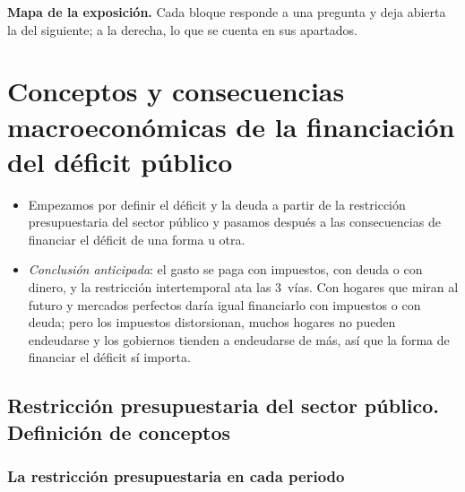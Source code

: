 \documentclass[11pt]{article}
\begin{document}
\begin{anotaciones}
\textbf{Mapa de la exposición.} Cada bloque responde a una pregunta y deja abierta la del siguiente; a la derecha, lo que se cuenta en sus apartados.
\begin{infografiacaja}
\caption{Mapa de la exposición: la pregunta de cada bloque y el hilo que los une}\label{figu:mapa-tema}
\end{infografiacaja}
\end{anotaciones}


\section{Conceptos y consecuencias macroeconómicas\cortetitulo{} de la financiación del déficit público}\label{sec:financiacion}

\begin{itemize}
\item Empezamos por definir el déficit y la deuda a partir de la restricción presupuestaria del sector público y pasamos después a las consecuencias de financiar el déficit de una forma u otra.
\item \emph{Conclusión anticipada}: el gasto se paga con impuestos, con deuda o con dinero, y la restricción intertemporal ata las 3~vías. Con hogares que miran al futuro y mercados perfectos daría igual financiarlo con impuestos o con deuda; pero los impuestos distorsionan, muchos hogares no pueden endeudarse y los gobiernos tienden a endeudarse de más, así que la forma de financiar el déficit sí importa.
\end{itemize}

\subsection{Restricción presupuestaria del sector público. Definición de conceptos}\label{sec:restriccion}

\subsubsection{La restricción presupuestaria en cada periodo}\label{sec:restriccion-periodo}
\end{document}
